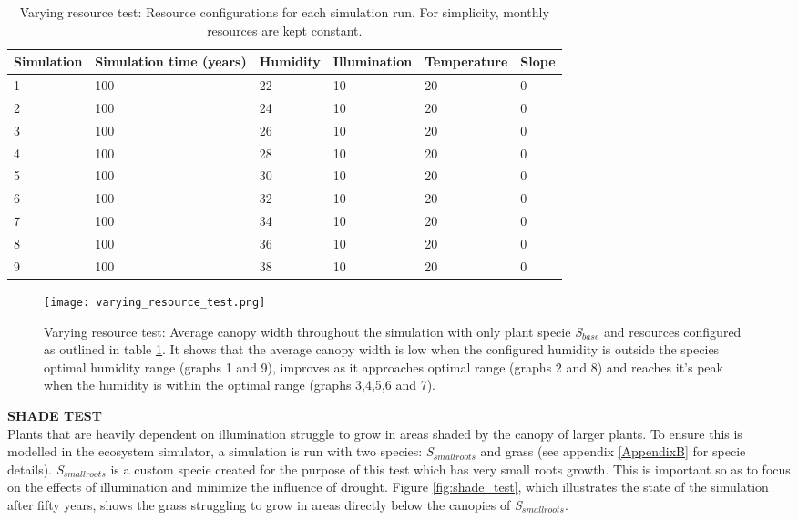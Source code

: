 \begin{table}[]
  \centering
	    \begin{tabular}{|p{2cm}|p{2cm}|p{2cm}|p{2cm}|p{2cm}|p{2cm}|}
		\hline
		\textbf{Simulation} & \textbf{Simulation time (years)} & \textbf{Humidity} & \textbf{Illumination} & \textbf{Temperature} & \textbf{Slope}\\
		\hline         
		1 & 100 & 22 & 10 & 20 & 0\\           
		\hline       
		2 & 100 & 24 & 10 & 20 & 0\\
		\hline       
		3 & 100 & 26 & 10 & 20 & 0\\           
		\hline     
		4 & 100 & 28 & 10 & 20 & 0\\           
		\hline     
		5 & 100 & 30 & 10 & 20 & 0\\           
		\hline       
		6 & 100 & 32 & 10 & 20 & 0\\           
		\hline       
		7 & 100 & 34 & 10 & 20 & 0\\           
		\hline      
		8 & 100 & 36 & 10 & 20 & 0\\           
		\hline       
		9 & 100 & 38 & 10 & 20 & 0\\           
		\hline     
		\end{tabular}
		\caption{Varying resource test: Resource configurations for each simulation run. For simplicity, monthly resources are kept constant.}
		\label{tab:varying_resource_test_simulations}
\end{table}

\begin{figure}
\center
	\texttt{[image: varying\_resource\_test.png]}
	\caption{ Varying resource test: Average canopy width throughout the simulation with only plant specie \textit{S$_{base}$} and resources configured as outlined in table \ref{tab:varying_resource_test_simulations}. It shows that the average canopy width is low when the configured humidity is outside the species optimal humidity range (graphs 1 and 9), improves as it approaches optimal range (graphs 2 and 8) and reaches it's peak when the humidity is within the optimal range (graphs 3,4,5,6 and 7).}
	\label{fig:varying_resource_test}
\end{figure}

\textbf{SHADE TEST}\\

Plants that are heavily dependent on illumination struggle to grow in areas shaded by the canopy of larger plants. To ensure this is modelled in the ecosystem simulator, a simulation is run with two species: \textit{S$_{smallroots}$} and grass (see appendix \ref{AppendixB} for specie details). \textit{S$_{smallroots}$} is a custom specie created for the purpose of this test which has very small roots growth. This is important so as to focus on the effects of illumination and minimize the influence of drought. Figure \ref{fig:shade_test}, which illustrates the state of the simulation after fifty years, shows the grass struggling to grow in areas directly below the canopies of \textit{S$_{smallroots}$}.\\

